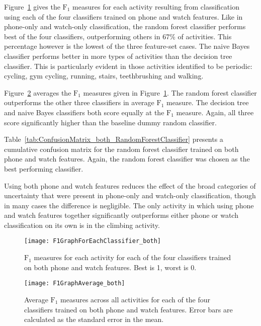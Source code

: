     Figure~\ref{fig:F1GraphForEachClassifier_both} gives the $\mathrm{F}_1$ measures for each activity resulting from classification using each of the four classifiers trained on phone and watch features. Like in phone-only and watch-only classification, the random forest classifier performs best of the four classifiers, outperforming others in 67\% of activities. This percentage however is the lowest of the three feature-set cases. The naive Bayes classifier performs better in more types of activities than the decision tree classifier. This is particularly evident in those activities identified to be  periodic: cycling, gym cycling, running, stairs, teethbrushing and walking.
    
    Figure~\ref{fig:F1GraphAverage_both} averages the $\mathrm{F}_1$ measures given in Figure~\ref{fig:F1GraphForEachClassifier_both}. The random forest classifier outperforms the other three classifiers in average $\mathrm{F}_1$ measure. The decision tree and naive Bayes classifiers both score equally at the $\mathrm{F}_1$ measure. Again, all three score significantly higher than the baseline dummy random classifier.
    
    Table~\ref{tab:ConfusionMatrix_both_RandomForestClassifier} presents a cumulative confusion matrix for the random forest classifier trained on both phone and watch features. Again, the random forest classifier was chosen as the best performing classifier.
    
    Using both phone and watch features reduces the effect of the broad categories of uncertainty that were present in phone-only and watch-only classification, though in many cases the difference is negligible. The only activity in which using phone and watch features together significantly outperforms either phone or watch classification on its own is in the climbing activity.
    
    \begin{figure}
      \centering
      \texttt{[image: F1GraphForEachClassifier\_both]}
      \caption[$\mathrm{F}_1$ measures for each activity for each of the four classifiers trained on both phone and watch features]{$\mathrm{F}_1$ measures for each activity for each of the four classifiers trained on both phone and watch features. Best is 1, worst is 0.}
      \label{fig:F1GraphForEachClassifier_both}
    \end{figure}
    
    \begin{figure}
      \centering
      \texttt{[image: F1GraphAverage\_both]}
      \caption[Average $\mathrm{F}_1$ measures across all activities for each of the four classifiers trained on both phone and watch features]{Average $\mathrm{F}_1$ measures across all activities for each of the four classifiers trained on both phone and watch features. Error bars are calculated as the standard error in the mean.}
      \label{fig:F1GraphAverage_both}
    \end{figure}
    

